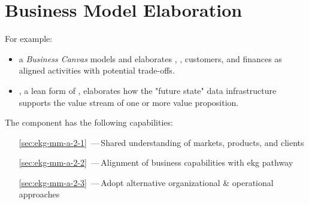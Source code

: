 \chapter{Business Model Elaboration}%
\label{ch:ekg-mm-a-2}
\label{ch:ekg-mm-business-model-elaboration}



For example:

\begin{itemize}
  \item a \textit{Business Canvas} models and elaborates , ,
        customers, and finances as aligned activities with potential trade-offs.
  \item {}, a lean form of , elaborates how the "future state" data infrastructure
  supports the value stream of one or more value proposition.
\end{itemize}


The  component has the following capabilities:

\begin{itemize}[leftmargin=.5in]
  \item [\ref{sec:ekg-mm-a-2-1}] \,---\,Shared understanding of markets, products, and clients
  \item [\ref{sec:ekg-mm-a-2-2}] \,---\,Alignment of business capabilities with \gls{ekg} pathway
  \item [\ref{sec:ekg-mm-a-2-3}] \,---\,Adopt alternative organizational \& operational approaches
\end{itemize}






